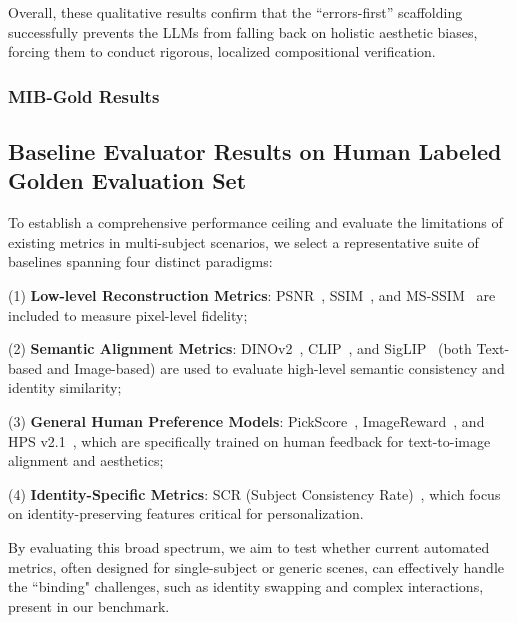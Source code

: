 \documentclass{article}
\begin{document}
Overall, these qualitative results confirm that the ``errors-first'' scaffolding successfully prevents the LLMs from falling back on holistic aesthetic biases, forcing them to conduct rigorous, localized compositional verification.

\subsubsection{MIB-Gold Results}

\subsection{Baseline Evaluator Results on Human Labeled Golden Evaluation Set}

To establish a comprehensive performance ceiling and evaluate the limitations of existing metrics in multi-subject scenarios, we select a representative suite of baselines spanning four distinct paradigms: 

(1) \textbf{Low-level Reconstruction Metrics}: PSNR~\cite{hore2010image}, SSIM~\cite{wang2004image}, and MS-SSIM~\cite{wang2003multiscale} are included to measure pixel-level fidelity; 

(2) \textbf{Semantic Alignment Metrics}: DINOv2~\cite{oquab2023dinov2}, CLIP~\cite{radford2021learning}, and SigLIP~\cite{zhai2023sigmoid} (both Text-based and Image-based) are used to evaluate high-level semantic consistency and identity similarity; 

(3) \textbf{General Human Preference Models}: PickScore~\cite{kirstain2023pick}, ImageReward~\cite{xu2023imagereward}, and HPS v2.1~\cite{wu2023human}, which are specifically trained on human feedback for text-to-image alignment and aesthetics; 

(4) \textbf{Identity-Specific Metrics}: SCR (Subject Consistency Rate)~\cite{chen2026identities}, which focus on  identity-preserving features critical for personalization.

By evaluating this broad spectrum, we aim to test whether current automated metrics, often designed for single-subject or generic scenes, can effectively handle the ``binding" challenges, such as identity swapping and complex interactions, present in our benchmark.

\end{document}
